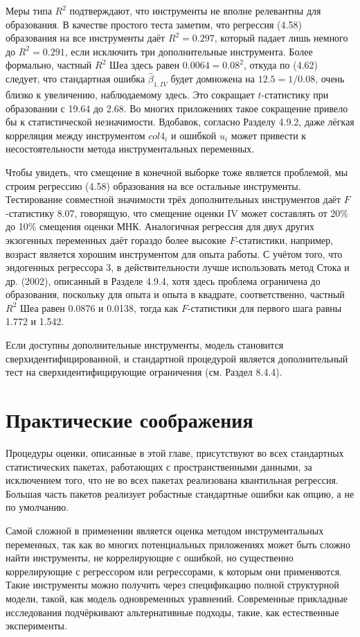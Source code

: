 Меры типа $R^2$ подтверждают, что инструменты не вполне релевантны для образования. В качестве простого теста заметим, что регрессия (4.58) образования на все инструменты даёт  $R^2=0.297$, который падает лишь немного до  $R^2=0.291$, если исключить три дополнительные инструмента. Более формально, частный  $R^2$ Шеа здесь равен $0.0064 = 0.08^2$, откуда по (4.62) следует, что стандартная ошибка $\hat{\beta}_{1, IV}$ будет домножена на $12.5 = 1/0.08$, очень близко к увеличению, наблюдаемому здесь. Это сокращает $t$-статистику при образовании с 19.64 до 2.68. Во многих приложениях такое сокращение привело бы к статистической незначимости. Вдобавок, согласно Разделу 4.9.2, даже лёгкая корреляция между инструментом $col4_i$ и ошибкой $u_i$ может привести к несостоятельности метода инструментальных переменных. 

Чтобы увидеть, что смещение в конечной выборке тоже является проблемой, мы строим регрессию (4.58) образования на все остальные инструменты. Тестирование совместной значимости трёх дополнительных инструментов даёт $F$-статистику 8.07, говорящую, что смещение оценки IV может составлять от 20\% до 10\% смещения оценки МНК. Аналогичная регрессия для двух других экзогенных переменных даёт гораздо более высокие  $F$-статистики,  например, возраст является хорошим инструментом для опыта работы. С учётом того, что эндогенных регрессора 3, в действительности лучше использовать метод Стока и др. (2002), описанный в Разделе 4.9.4, хотя здесь проблема ограничена до образования, поскольку для опыта и опыта в квадрате, соответственно, частный $R^2$ Шеа равен 0.0876 и 0.0138, тогда как $F$-статистики для первого шага равны 1.772 и 1.542.

Если доступны дополнительные инструменты, модель становится сверхидентифицированной, и стандартной процедурой является дополнительный тест на сверхидентифицирующие ограничения (см. Раздел 8.4.4).
 
\section{Практические соображения}

Процедуры оценки, описанные в этой главе, присутствуют во всех стандартных статистических пакетах, работающих с пространственными данными, за исключением того, что не во всех пакетах реализована квантильная регрессия. Большая часть пакетов реализует робастные стандартные ошибки как опцию, а не по умолчанию.

Самой сложной в применении является оценка методом инструментальных переменных, так как во многих потенциальных приложениях может быть сложно найти инструменты, не коррелирующие с ошибкой, но существенно коррелирующие с регрессором или регрессорами, к которым они применяются. Такие инструменты можно получить через спецификацию полной структурной модели, такой, как модель одновременных уравнений. Современные прикладные исследования подчёркивают альтернативные подходы, такие, как естественные эксперименты.

